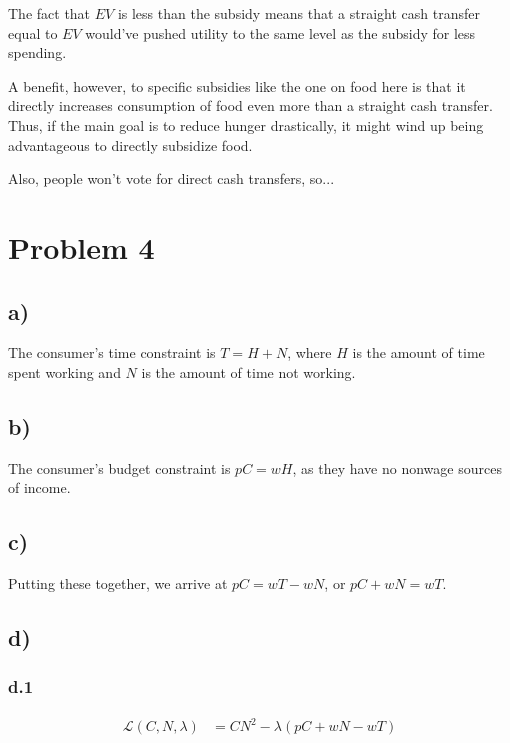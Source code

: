 \documentclass[12pt,letterpaper]{article}
\theoremstyle{definition}
\newcommand{\Lag}{\mathcal{L}}
\begin{document}
The fact that $EV$ is less than the subsidy means that a straight cash transfer
equal to $EV$ would've pushed utility to the same level as the subsidy for less
spending.

A benefit, however, to specific subsidies like the one on food here is that it
directly increases consumption of food even more than a straight cash transfer.
Thus, if the main goal is to reduce hunger drastically, it might wind up being
advantageous to directly subsidize food.

Also, people won't vote for direct cash transfers, so...

\section*{Problem 4}

\subsection*{a)}

The consumer's time constraint is $T = H + N$, where $H$ is the amount of time
spent working and $N$ is the amount of time not working.

\subsection*{b)}

The consumer's budget constraint is $pC = wH$, as they have no nonwage sources
of income.

\subsection*{c)}

Putting these together, we arrive at $pC = wT - wN$, or $pC + wN = wT$.

\subsection*{d)}

\subsubsection*{d.1}

\begin{align*}
  \Lag(C,N,\lambda) &= CN^2 - \lambda(pC + wN - wT) \\
\end{align*}
\end{document}
